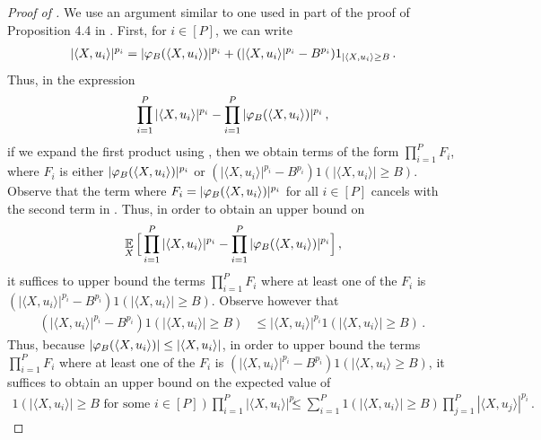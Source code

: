 \begin{proof}[Proof of ]
We use an argument similar to one used in part of the proof of Proposition 4.4 in \citet{ALPT2009_concentration}. First, for $i \in [P]$, we can write 
\begin{align} \label{eq:trunc_exp}
|\langle X, u_i \rangle|^{p_i} = |{\varphi_B}(\langle X, u_i \rangle)|^{p_i} + (|\langle X, u_i \rangle|^{p_i} - B^{p_i}) 1_{|\langle X, u_i \rangle \geq B} \,.
\end{align}
Thus, in the expression
\begin{align} \label{eq:inner_prod_diff}
\prod_{i = 1}^P |\langle X, u_i \rangle|^{p_i} - \prod_{i = 1}^P |{\varphi_B}(\langle X, u_i \rangle)|^{p_i} \,,
\end{align}
if we expand the first product using , then we obtain terms of the form $\prod_{i = 1}^P F_i$, where $F_i$ is either $|{\varphi_B}(\langle X, u_i \rangle)|^{p_i}$ or $(|\langle X, u_i \rangle|^{p_i} - B^{p_i}) 1(|\langle X, u_i \rangle| \geq B)$. Observe that the term where $F_i = |{\varphi_B}(\langle X, u_i \rangle)|^{p_i}$ for all $i \in [P]$ cancels with the second term in . Thus, in order to obtain an upper bound on
\begin{align}
\operatorname*{\mathbb{E}}_X \Big[ \prod_{i = 1}^P |\langle X, u_i \rangle|^{p_i} - \prod_{i = 1}^P |{\varphi_B}(\langle X, u_i \rangle)|^{p_i} \Big] \,,
\end{align}
it suffices to upper bound the terms $\prod_{i = 1}^P F_i$ where at least one of the $F_i$ is $(|\langle X, u_i \rangle|^{p_i} - B^{p_i}) 1(|\langle X, u_i \rangle| \geq B)$. Observe however that
\begin{align}
(|\langle X, u_i \rangle|^{p_i} - B^{p_i}) 1(|\langle X, u_i \rangle| \geq B) 
& \leq |\langle X, u_i \rangle|^{p_i} 1(|\langle X, u_i \rangle| \geq B) \period
\end{align}
Thus, because $|{\varphi_B}(\langle X, u_i \rangle)| \leq |\langle X, u_i \rangle|$, in order to upper bound the terms $\prod_{i = 1}^P F_i$ where at least one of the $F_i$ is $(|\langle X, u_i \rangle|^{p_i} - B^{p_i}) 1(|\langle X, u_i \rangle \geq B)$, it suffices to obtain an upper bound on the expected value of
\begin{align}
1(|\langle X, u_i \rangle| \geq B \text{ for some } i \in [P]) \prod_{i = 1}^P |\langle X, u_i \rangle|^{p_i}
& \leq \sum_{i = 1}^P 1(|\langle X, u_i \rangle| \geq B) \prod_{j = 1}^P |\langle X, u_j \rangle|^{p_i} \period
\end{align}

\end{proof}
